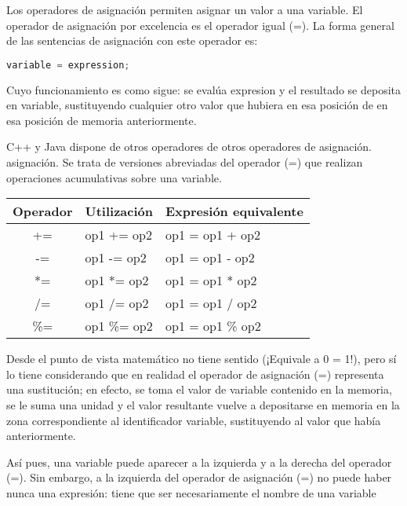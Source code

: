Los operadores de asignación permiten asignar
 un valor a una variable. El operador de
 asignación por excelencia es el operador igual
 (=). La forma general de las sentencias de
asignación con este operador es:
\begin{lstlisting}[language=C++]
variable = expression;	
\end{lstlisting}

Cuyo funcionamiento es como sigue: se evalúa expresion y el resultado se deposita en
variable, sustituyendo cualquier otro valor que hubiera en esa posición de en esa posición de
memoria anteriormente.

C++ y Java dispone de otros operadores de otros operadores de asignación.
asignación. Se trata de versiones abreviadas del operador (=) que realizan operaciones acumulativas sobre una variable.

\begin{tabular}{|c|p{6cm}|p{6cm}|}
	\hline
	\textbf{Operador}	& \textbf{Utilización} &  \textbf{Expresión equivalente} \\
	\hline
	+= & op1 += op2 & op1 = op1 + op2 \\
	\hline
	-= & op1 -= op2 & op1 = op1 - op2 \\
	\hline
	*= & op1 *= op2 & op1 = op1 * op2 \\
	\hline
	/= & op1 /= op2 & op1 = op1 / op2 \\
	\hline
	\%= & op1 \%= op2 & op1 = op1 \% op2 \\
	\hline
\end{tabular}

Desde el punto de vista matemático no tiene sentido (¡Equivale a 0 = 1!),
pero sí lo tiene considerando que en realidad el operador de asignación (=) representa una
sustitución; en efecto, se toma el valor de variable contenido en la memoria, se le suma una
 unidad y el valor resultante vuelve a depositarse en memoria en la zona correspondiente al
identificador variable, sustituyendo al valor que había anteriormente. 

Así pues, una variable puede aparecer a la izquierda y a la derecha del operador (=). Sin
embargo, a la izquierda del operador de asignación (=) no puede haber nunca una expresión:
tiene que ser necesariamente el nombre de una variable
